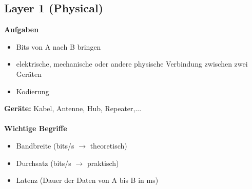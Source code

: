 \subsection{Layer 1 (Physical)}
\textbf{Aufgaben}
\begin{itemize}
	\item Bits von A nach B bringen
	\item elektrische, mechanische oder andere physische Verbindung zwischen zwei Geräten
	\item Kodierung
\end{itemize}
\textbf{Geräte:} Kabel, Antenne, Hub, Repeater,... \\ \\
\textbf{Wichtige Begriffe}
\begin{itemize}
	\item Bandbreite (bits/s $\rightarrow$ theoretisch)
	\item Durchsatz (bits/s $\rightarrow$ praktisch)
	\item Latenz (Dauer der Daten von A bis B in ms)
\end{itemize}

